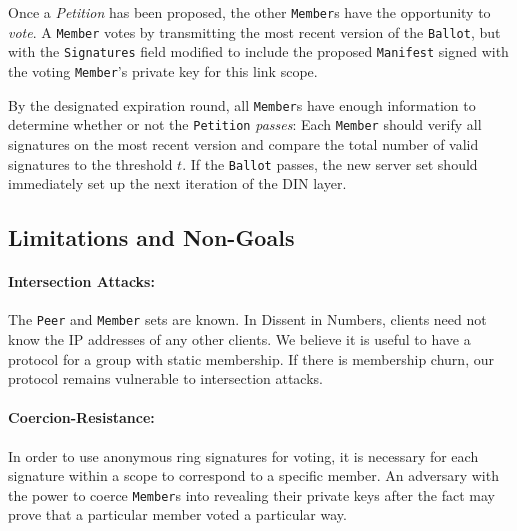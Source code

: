 Once a \emph{Petition} has been proposed, the other \texttt{Member}s have the
opportunity to \emph{vote}. A \texttt{Member} votes by transmitting the most
recent version of the \texttt{Ballot}, but with the \texttt{Signatures} field
modified to include the proposed \texttt{Manifest} signed with the voting
\texttt{Member}'s private key for this link scope.

By the designated expiration round, all \texttt{Member}s have enough
information to determine whether or not the \texttt{Petition} \emph{passes}:
Each \texttt{Member} should verify all signatures on the most recent
version
and compare the total number of valid signatures to the threshold $t$. If the
\texttt{Ballot} passes, the new server set should immediately set up the
next iteration of the DIN layer.

\subsection{Limitations and Non-Goals}
  \paragraph{Intersection Attacks:} The \texttt{Peer} and \texttt{Member} sets are known. In Dissent in
    Numbers, clients need not know the IP addresses of any other clients. We
    believe it is useful to have a protocol for a group with static membership.
    If there is membership churn, our protocol remains vulnerable to
    intersection attacks.
  \paragraph{Coercion-Resistance:} In order to use anonymous ring signatures for voting, it is necessary
    for each signature within a scope to correspond to a specific member. An
    adversary with the power to coerce \texttt{Member}s into revealing their
    private keys after the fact may prove that a particular member voted a
    particular way\cite{lrs}.
